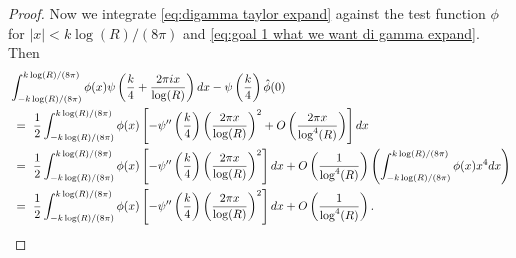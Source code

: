 \documentclass[10pt,a4paper]{amsart}
\begin{document}
\begin{proof}
Now we integrate \eqref{eq:digamma taylor expand} against the test function $\phi$ for $|x| < k\log(R)/(8\pi)$ and \eqref{eq:goal 1 what we want di gamma expand}. Then
\begin{align}\label{eq: digamma substution}
&\int_{-k\log(R)/(8\pi)}^{k\log(R)/(8\pi)}\phi(x)\psi\left(\frac{k}{4}+ \frac{2\pi i x}{\log(R)}\right) dx - \psi\left(\frac{k}{4}\right)\hat\phi(0) \notag \\ & \ = \ \frac{1}{2}\int_{-k\log(R)/(8\pi)}^{k\log(R)/(8\pi)} \phi(x)\left[-\psi''\left(\frac{k}{4}\right)\left(\frac{2\pi x}{\log(R)}\right)^2 + O\left(\frac{2\pi x}{\log^4(R)}\right)\right]dx \notag \\
& \ = \ \frac{1}{2}\int_{-k\log(R)/(8\pi)}^{k\log(R)/(8\pi)} \phi(x)\left[-\psi''\left(\frac{k}{4}\right)\left(\frac{2\pi x}{\log(R)}\right)^2\right]dx + O\left(\frac{1}{\log^4(R)}\right)\left(\int_{-k\log(R)/(8\pi)}^{k\log(R)/(8\pi)} \phi(x)x^4dx\right) \notag \\ 
& \ = \ \frac{1}{2}\int_{-k\log(R)/(8\pi)}^{k\log(R)/(8\pi)} \phi(x)\left[-\psi''\left(\frac{k}{4}\right)\left(\frac{2\pi x}{\log(R)}\right)^2\right]dx + O\left(\frac{1}{\log^4(R)}\right).
\end{align}


\end{proof}
\end{document}

